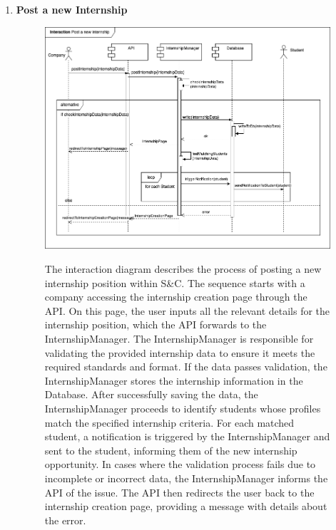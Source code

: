 \begin{enumerate}
    \newpage
    \item \textbf{Post a new Internship}
    \begin{figure}[h!]
            \centering  \includegraphics[width=1\textwidth]{DD/Images/Interactions/INT09_PostNewInternship.drawio.png}
            \label{fig:ComponentViewDiagram}
            \caption*{The interaction diagram describes the process of posting a new internship position within S\&C. The sequence starts with a company accessing the internship creation page through the API. On this page, the user inputs all the relevant details for the internship position, which the API forwards to the InternshipManager. The InternshipManager is responsible for validating the provided internship data to ensure it meets the required standards and format. If the data passes validation, the InternshipManager stores the internship information in the Database. After successfully saving the data, the InternshipManager proceeds to identify students whose profiles match the specified internship criteria. For each matched student, a notification is triggered by the InternshipManager and sent to the student, informing them of the new internship opportunity. In cases where the validation process fails due to incomplete or incorrect data, the InternshipManager informs the API of the issue. The API then redirects the user back to the internship creation page, providing a message with details about the error.}       
    \end{figure}


\end{enumerate}
